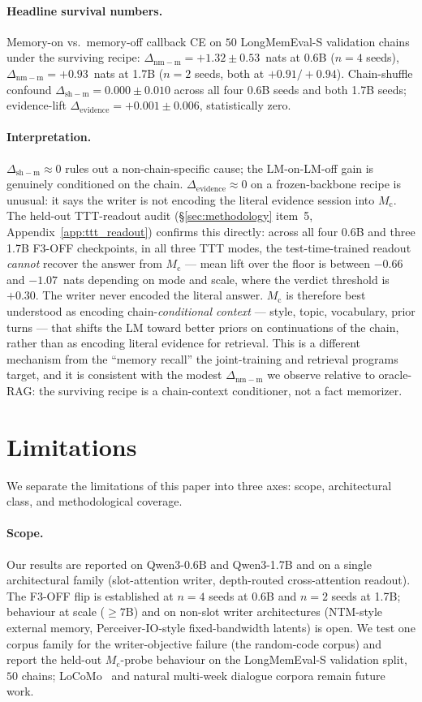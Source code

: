 \documentclass{article}
\newcommand{\Mc}{M_{\mathrm{c}}}
\newcommand{\dnm}{\Delta_{\mathrm{nm-m}}}
\newcommand{\dsh}{\Delta_{\mathrm{sh-m}}}
\newcommand{\elift}{\Delta_{\mathrm{evidence}}}
\begin{document}
\paragraph{Headline survival numbers.}  Memory-on vs.\ memory-off
callback CE on $50$ LongMemEval-S validation chains under the
surviving recipe: $\dnm = +1.32 \pm 0.53$~nats at 0.6B ($n=4$
seeds), $\dnm = +0.93$~nats at 1.7B ($n=2$ seeds, both at
$+0.91/+0.94$).  Chain-shuffle confound
$\dsh = 0.000 \pm 0.010$ across all four 0.6B seeds and both 1.7B
seeds; evidence-lift $\elift = +0.001 \pm 0.006$, statistically
zero.

\paragraph{Interpretation.}  $\dsh \approx 0$ rules out a
non-chain-specific cause; the LM-on-LM-off gain is genuinely
conditioned on the chain.  $\elift \approx 0$ on a frozen-backbone
recipe is unusual: it says the writer is not encoding the literal
evidence session into $\Mc$.  The held-out TTT-readout audit
(\S\ref{sec:methodology} item~5, Appendix~\ref{app:ttt_readout})
confirms this directly: across all four 0.6B and three 1.7B F3-OFF
checkpoints, in all three TTT modes, the test-time-trained readout
\emph{cannot} recover the answer from $\Mc$ --- mean lift over the
floor is between $-0.66$ and $-1.07$~nats depending on mode and
scale, where the verdict threshold is $+0.30$.  The writer never
encoded the literal answer.  $\Mc$ is therefore best understood as
encoding chain-\emph{conditional context} --- style, topic,
vocabulary, prior turns --- that shifts the LM toward better priors
on continuations of the chain, rather than as encoding literal
evidence for retrieval.  This is a different mechanism from the
``memory recall'' the joint-training and retrieval programs target,
and it is consistent with the modest $\dnm$ we observe relative to
oracle-RAG: the surviving recipe is a chain-context conditioner, not
a fact memorizer.

\section{Limitations}
\label{sec:limitations}

We separate the limitations of this paper into three axes: scope,
architectural class, and methodological coverage.

\paragraph{Scope.}  Our results are reported on Qwen3-0.6B and
Qwen3-1.7B and on a single architectural family (slot-attention
writer, depth-routed cross-attention readout).  The F3-OFF flip is
established at $n=4$ seeds at 0.6B and $n=2$ seeds at 1.7B;
behaviour at scale ($\ge 7$B) and on non-slot writer architectures
(NTM-style external memory, Perceiver-IO-style fixed-bandwidth
latents) is open.  We test one corpus family for the
writer-objective failure (the random-code corpus) and report the
held-out $\Mc$-probe behaviour on the LongMemEval-S validation
split, $50$ chains; LoCoMo~\cite{locomo2024} and natural multi-week
dialogue corpora remain future work.
\end{document}
